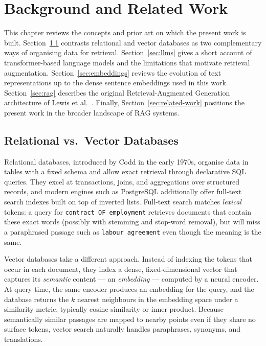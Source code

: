 \chapter{Background and Related Work}
\label{chap:background}

This chapter reviews the concepts and prior art on which the present work is
built. Section~\ref{sec:relational-vs-vector} contrasts relational and vector
databases as two complementary ways of organising data for retrieval.
Section~\ref{sec:llms} gives a short account of transformer-based language
models and the limitations that motivate retrieval augmentation.
Section~\ref{sec:embeddings} reviews the evolution of text representations up
to the dense sentence embeddings used in this work.
Section~\ref{sec:rag} describes the original Retrieval-Augmented Generation
architecture of Lewis et al.~\cite{Lewis2020RAG}. Finally,
Section~\ref{sec:related-work} positions the present work in the broader
landscape of RAG systems.

\section{Relational vs.\ Vector Databases}
\label{sec:relational-vs-vector}

Relational databases, introduced by Codd in the early 1970s, organise data in
tables with a fixed schema and allow exact retrieval through declarative SQL
queries. They excel at transactions, joins, and aggregations over structured
records, and modern engines such as PostgreSQL additionally offer full-text
search indexes built on top of inverted lists. Full-text search matches
\emph{lexical} tokens: a query for \texttt{contract OF employment} retrieves
documents that contain these exact words (possibly with stemming and
stop-word removal), but will miss a paraphrased passage such as
\texttt{labour agreement} even though the meaning is the same.

Vector databases take a different approach. Instead of indexing the tokens
that occur in each document, they index a dense, fixed-dimensional vector
that captures its \emph{semantic} content --- an \emph{embedding} --- computed
by a neural encoder. At query time, the same encoder produces an embedding
for the query, and the database returns the $k$ nearest neighbours in the
embedding space under a similarity metric, typically cosine similarity or
inner product. Because semantically similar passages are mapped to nearby
points even if they share no surface tokens, vector search naturally handles
paraphrases, synonyms, and translations.

